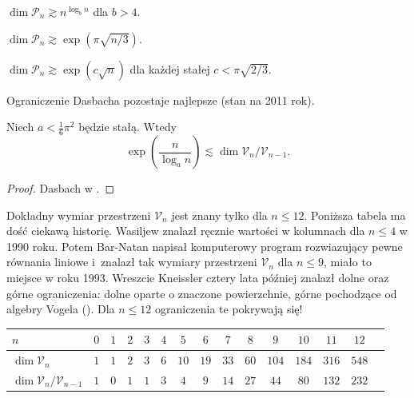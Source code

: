 \begin{proposition}
    $\dim \mathcal P_n \gtrsim n^{\log_b n}$ dla $b > 4$.
\end{proposition}

\begin{proposition}[Koncewicz, 1997]
    $\dim \mathcal P_n \gtrsim \exp (\pi \sqrt{n/3})$.
\end{proposition}

\begin{proposition}[Dasbach, 2000]
    $\dim \mathcal P_n \gtrsim \exp (c \sqrt{n})$ dla każdej stałej $c < \pi \sqrt{2/3}$.
\end{proposition}

Ograniczenie Dasbacha pozostaje najlepsze (stan na 2011 rok).

\begin{corollary}
    Niech $a < \frac 1 6 \pi^2$ będzie stałą.
    Wtedy
    \begin{equation}
        \exp \left(\frac {n}{\log_a n} \right) \lesssim \dim \mathcal V_n / \mathcal V_{n-1}.
    \end{equation}
\end{corollary}

\begin{proof}
    Dasbach w \cite{dasbach00}.
\end{proof}

Dokładny wymiar przestrzeni $\mathcal V_n$ jest znany tylko dla $n \le 12$.
Poniższa tabela ma dość ciekawą historię.
Wasiljew znalazł ręcznie wartości w kolumnach dla $n \le 4$ w 1990 roku.
Potem Bar-Natan napisał komputerowy program rozwiazujący pewne równania liniowe i~znalazł tak wymiary przestrzeni $\mathcal V_n$ dla $n \le 9$, miało to miejsce w roku 1993.
Wreszcie Kneissler cztery lata później znalazł dolne oraz górne ograniczenia: dolne oparte o znaczone powierzchnie, górne pochodzące od algebry Vogela (\cite{kneissler97}).
%
Dla $n \le 12$ ograniczenia te pokrywają się!

\renewcommand*{\arraystretch}{1.4}
\footnotesize
\begin{longtable}{lcccccccccccccc}
\hline
    $n$ & $0$ & $1$ & $2$ & $3$ & $4$ & $5$ & $6$ & $7$ & $8$ & $9$ & $10$ & $11$ & $12$ \\ \hline \endhead
    $\dim \mathcal V_n$ & $1$ & $1$ & $2$ & $3$ & $6$ & $10$ & $19$ & $33$ & $60$ & $104$ & $184$ & $316$ & $548$ \\
    $\dim \mathcal V_n / \mathcal V_{n-1}$ & $1$ & $0$ & $1$ & $1$ & $3$ & $4$ & $9$ & $14$ & $27$ & $44$ & $80$ & $132$ & $232$ \\
    \hline
\end{longtable}
\normalsize

